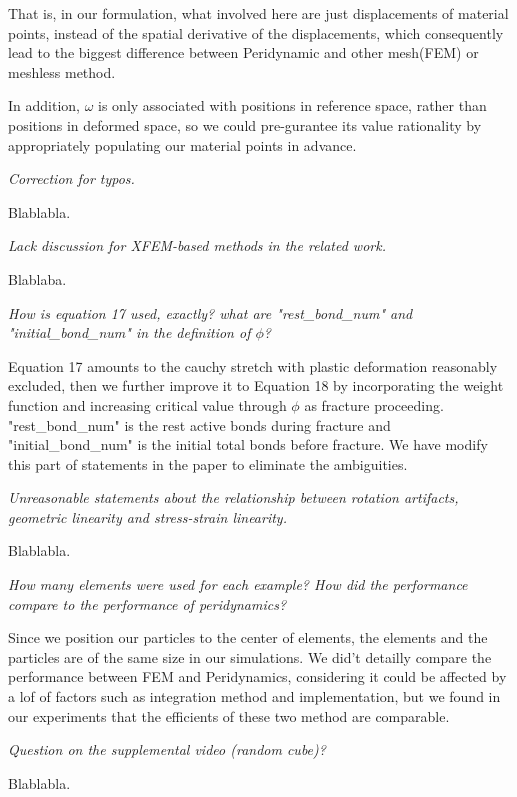 That is, in our formulation, what involved here are just displacements of material points,
instead of the spatial derivative of the displacements, which consequently lead to the biggest difference between Peridynamic and other mesh(FEM) or meshless method.

In addition, $\omega$ is only associated with positions in reference space, rather than positions in deformed space,
so we could pre-gurantee its value rationality by appropriately populating our material points in advance.

\emph{Correction for typos.}

Blablabla.

\emph{Lack discussion for XFEM-based methods in the related work.}

Blablaba.

\emph{How is equation 17 used, exactly? what are "rest\_bond\_num" and "initial\_bond\_num" in the definition of $\phi$?}

Equation 17 amounts to the cauchy stretch with plastic deformation reasonably excluded, then we further improve it to Equation 18 by incorporating the weight function and increasing critical value through $\phi$ as fracture proceeding. "rest\_bond\_num" is the rest active bonds during fracture and "initial\_bond\_num" is the initial total bonds before fracture. We have modify this part of statements in the paper to eliminate the ambiguities.

\emph{Unreasonable statements about the relationship between rotation artifacts, geometric linearity and stress-strain linearity.}

Blablabla.

\emph{How many elements were used for each example? How did the performance compare to the performance of peridynamics?}

Since we position our particles to the center of elements, the elements and the particles are of the same size in our simulations.
We did't detailly compare the performance between FEM and Peridynamics, considering it could be affected by a lof of factors such as integration method and implementation, but we found in our experiments that the efficients of these two method are comparable.

\emph{Question on the supplemental video (random cube)?}

Blablabla.


%





